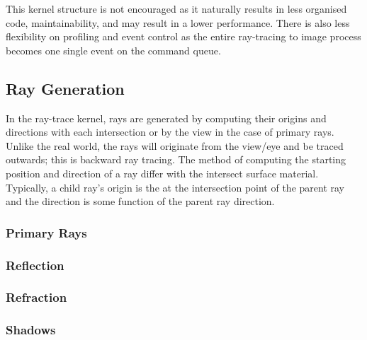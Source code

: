 \documentclass[final]{cmpreport}
\begin{document}
This kernel structure is not encouraged \citep{laine2013megakernels} as it naturally results in less organised code, maintainability, and may result in a lower performance. There is also less flexibility on profiling and event control as the entire ray-tracing to image process becomes one single event on the command queue.

\subsection{Ray Generation}

In the ray-trace kernel, rays are generated by computing their origins and directions with each intersection or by the view in the case of primary rays. Unlike the real world, the rays will originate from the view/eye and be traced outwards; this is backward ray tracing. The method of computing the starting position and direction of a ray differ with the intersect surface material. Typically, a child ray's origin is the at the intersection point of the parent ray and the direction is some function of the parent ray direction.

\subsubsection{Primary Rays}



\subsubsection{Reflection}

\subsubsection{Refraction}

\subsubsection{Shadows}
\end{document}
